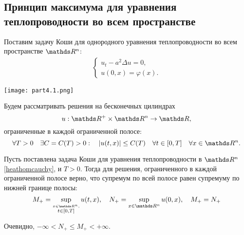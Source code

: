 
\subsection{Принцип максимума для уравнения теплопроводности во всем пространстве}
Поставим задачу Коши для однородного уравнения теплопроводности во всем пространстве $\real^n$:
\begin{align}
    \begin{cases} 
        u_t - a^2 \Delta u = 0, \\
        u (0, x) = \varphi (x).
    \end{cases}
\label{heathomcauchy}
\end{align}

\begin{center}
\texttt{[image: part4.1.png]}
\end{center}

Будем рассматривать решения на бесконечных цилиндрах $$u : \real^+ \times \real^n \rightarrow \real,$$ 
ограниченные в каждой ограниченной полосе: 
\begin{equation}
	\forall T > 0 \quad \exists C = C(T) > 0 : \quad |u(t, x)| \leq C(T) \quad \forall t \in [0, T] \quad \forall x \in \real^n.
\label{условие во всем пространстве}
\end{equation}

\begin{theorem}
Пусть поставлена задача Коши для уравнения теплопроводности в $\real^n$ \eqref{heathomcauchy}, и $T > 0$. Тогда для решения, ограниченного в каждой ограниченной полосе верно, что супремум по всей полосе равен супремуму по нижней границе полосы:
$$ M_+ = \sup_{\stackrel{x \in \real^n,} {t \in [0, T]}}u(t,x), \quad N_+ = \sup_{x \in \real^n} u(0, x), \quad M_+ = N_+ $$

\begin{note}
Очевидно, $-\infty < N_+ \leq M_+ < +\infty.$
\end{note}
\end{theorem}

